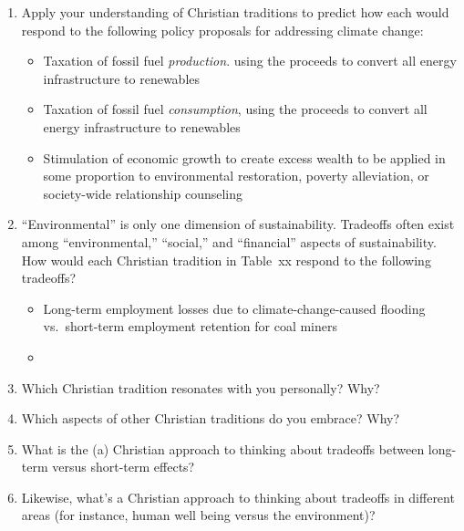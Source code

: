\documentclass[12pt]{article}
\begin{document}
\begin{enumerate}

  \item Apply your understanding of Christian traditions to 
		predict how each would respond to the following policy proposals
		for addressing climate change:
		\begin{itemize}

		  \item Taxation of fossil fuel \emph{production}. using the proceeds to 
		        convert all energy infrastructure to renewables
		  
		  \item Taxation of fossil fuel \emph{consumption}, using the proceeds to 
		        convert all energy infrastructure to renewables

		  \item Stimulation of economic growth to create excess wealth to be applied 
		        in some proportion to environmental restoration, poverty alleviation,  
				or society-wide relationship counseling

		\end{itemize}
  \item ``Environmental'' is only one dimension of sustainability. 
        Tradeoffs often exist among ``environmental,'' ``social,'' and ``financial'' 
		aspects of sustainability. 
		How would each Christian tradition in Table~xx respond to the following tradeoffs?
		\begin{itemize}

		  \item Long-term employment losses due to climate-change-caused flooding vs.\ 
		        short-term employment retention for coal miners

		  \item

		\end{itemize}
  \item Which Christian tradition resonates with you personally? Why?
  
  \item Which aspects of other Christian traditions do you embrace? Why?

  \item What is the (a) Christian approach to thinking about tradeoffs 
        between long-term versus short-term effects?
		
  \item Likewise, what's a Christian approach to thinking about tradeoffs in different areas
        (for instance, human well being versus the environment)?


\end{enumerate}
\end{document}
